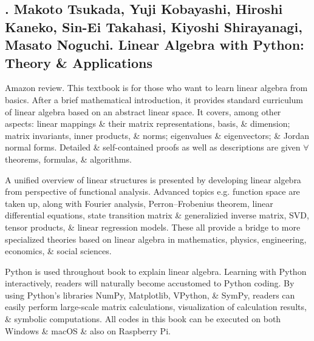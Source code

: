 \documentclass{article}
\begin{document}

\subsection{\cite{Tsukada_Kobayashi_Kaneko_Takahasi_Shirayanagi_Noguchi2023}. {\sc Makoto Tsukada, Yuji Kobayashi, Hiroshi Kaneko, Sin-Ei Takahasi, Kiyoshi Shirayanagi, Masato Noguchi}. Linear Algebra with Python: Theory \& Applications}
{\sf[1 citations]}

{\sf Amazon review.} This textbook is for those who want to learn linear algebra from basics. After a brief mathematical introduction, it provides standard curriculum of linear algebra based on an abstract linear space. It covers, among other aspects: linear mappings \& their matrix representations, basis, \& dimension; matrix invariants, inner products, \& norms; eigenvalues \& eigenvectors; \& Jordan normal forms. Detailed \& self-contained proofs as well as descriptions are given $\forall$ theorems, formulas, \& algorithms.

A unified overview of linear structures is presented by developing linear algebra from perspective of functional analysis. Advanced topics e.g. function space are taken up, along with Fourier analysis, Perron--Frobenius theorem, linear differential equations, state transition matrix \& generalizied inverse matrix, SVD, tensor products, \& linear regression models. These all provide a bridge to more specialized theories based on linear algebra in mathematics, physics, engineering, economics, \& social sciences.

Python is used throughout book to explain linear algebra. Learning with Python interactively, readers will naturally become accustomed to Python coding. By using Python's libraries NumPy, Matplotlib, VPython, \& SymPy, readers can easily perform large-scale matrix calculations, visualization of calculation results, \& symbolic computations. All codes in this book can be executed on both Windows \& macOS \& also on Raspberry Pi.
\end{document}
